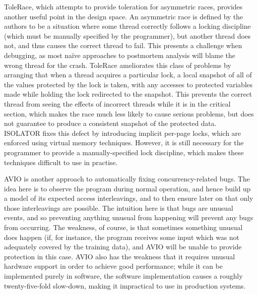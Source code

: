 ToleRace\cite{Kirovski2007}, which attempts to provide toleration for
asymmetric races, provides another useful point in the design space.
An asymmetric race is defined by the authors to be a situation where
some thread correctly follows a locking discipline (which must be
manually specified by the programmer), but another thread does not,
and thus causes the correct thread to fail.  This presents a challenge
when debugging, as most na\"{i}ve approaches to postmortem analysis
will blame the wrong thread for the crash.  ToleRace ameliorates this
class of problems by arranging that when a thread acquires a
particular lock, a local snapshot of all of the values protected by
the lock is taken, with any accesses to protected variables made while
holding the lock redirected to the snapshot.  This prevents the
correct thread from seeing the effects of incorrect threads while it
is in the critical section, which makes the race much less likely to
cause serious problems, but does not guarantee to produce a consistent
snapshot of the protected data.  ISOLATOR\cite{Ramalingam2009} fixes
this defect by introducing implicit per-page locks, which are enforced
using virtual memory techniques.  However, it is still necessary for
the programmer to provide a manually-specified lock discipline, which
makes these techniques difficult to use in practise.

AVIO\cite{Lu} is another approach to automatically fixing
concurrency-related bugs.  The idea here is to observe the program
during normal operation, and hence build up a model of its expected
access interleavings, and to then ensure later on that only those
interleavings are possible.  The intuition here is that bugs are
unusual events, and so preventing anything unusual from happening will
prevent any bugs from occurring.  The weakness, of course, is that
sometimes something unusual does happen (if, for instance, the program
receives some input which was not adequately covered by the training
data), and AVIO will be unable to provide protection in this case.
AVIO also has the weakness that it requires unusual hardware support
in order to achieve good performance; while it can be implemented
purely in software, the software implementation causes a roughly
twenty-five-fold slow-down, making it impractical to use in production
systems.


